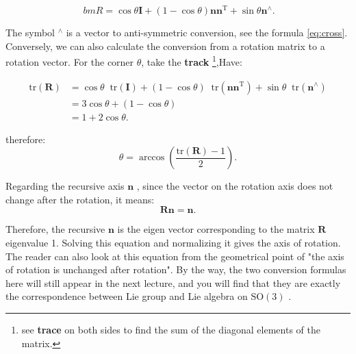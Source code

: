 \begin{equation}
\label{eq:rogridues}
\ bm{R} = \cos \theta \bm{I} + \left({ 1 - \cos \theta } \right) \bm{n} { \bm {n} ^ \mathrm{T} } + \sin \theta { \bm{n}^ \wedge }.
\end{equation}

The symbol $ ^ \wedge $ is a vector to anti-symmetric conversion, see the formula \eqref{eq:cross}. Conversely, we can also calculate the conversion from a rotation matrix to a rotation vector. For the corner $ \theta $, take the \textbf{track} \footnote {see \textbf{trace} on both sides to find the sum of the diagonal elements of the matrix. },Have:

\begin{equation}
\begin{aligned}
  \mathrm{tr} \left( \bm{R} \right) &= \cos \theta \mathop{}\!\mathrm{tr}\left( \bm{I} \right) + \left( {1 - \cos \theta } \right) \mathop{}\!\mathrm{tr} \left( { \bm{n} {\bm{n}^\mathrm{T}}} \right) + \sin \theta \mathop{}\!\mathrm{tr} ({\bm{n}^ \wedge })\\
&= 3\cos \theta  + (1 - \cos \theta )\\
&= 1 + 2\cos \theta .
\end{aligned} 
\end{equation}

therefore:
\begin{equation}
\label{eq:R2theta}
\theta = \arccos ( \frac{\mathrm{tr}(\bm{R}) - 1}{2}  ) .
\end{equation}

Regarding the recursive axis $ \bm{n} $ , since the vector on the rotation axis does not change after the rotation, it means:
\begin{equation}
\bm{R} \bm{n} = \bm{n}.
\end{equation}

Therefore, the recursive $ \bm{n} $ is the eigen vector corresponding to the matrix $ \bm{R} $ eigenvalue 1. Solving this equation and normalizing it gives the axis of rotation. The reader can also look at this equation from the geometrical point of "the axis of rotation is unchanged after rotation". By the way, the two conversion formulas here will still appear in the next lecture, and you will find that they are exactly the correspondence between Lie group and Lie algebra on $ \mathrm{SO}(3) $ .
